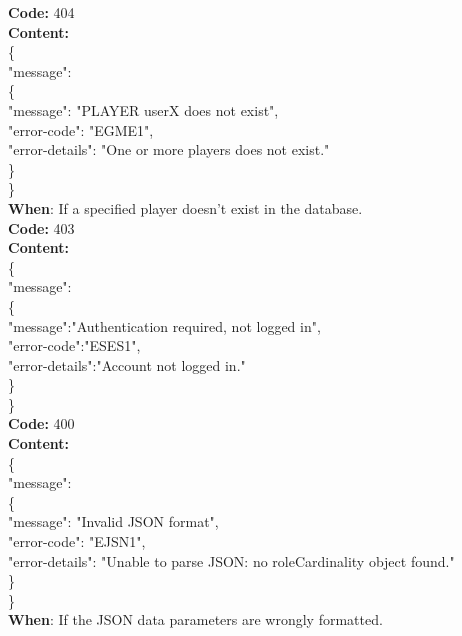 \begin{itemize}
        \textbf{Code:} 404\\
        \textbf{Content:}\\
        \{\\
        \tab "message": \\
        \tab \{\\
        \tab \tab "message": "PLAYER userX does not exist",\\
        \tab \tab "error-code": "EGME1",\\
        \tab \tab "error-details": "One or more players does not exist."\\
         \tab \}\\
        \}\\
        \textbf{When}: If a specified player doesn't exist in the database. \\
        
        \textbf{Code:} 403\\
        \textbf{Content:}\\
        \{\\
         \tab "message":\\
         \tab \{\\
         \tab \tab "message":"Authentication required, not logged in",\\
         \tab \tab "error-code":"ESES1",\\
         \tab \tab "error-details":"Account not logged in."\\
         \tab \}\\
        \}\\
        
        \textbf{Code:} 400\\
        \textbf{Content:}\\
        \{\\
        \tab "message": \\
        \tab \{\\
        \tab \tab "message": "Invalid JSON format",\\
        \tab \tab "error-code": "EJSN1",\\
        \tab \tab "error-details": "Unable to parse JSON: no roleCardinality object found."\\
         \tab \}\\
        \}\\
        \textbf{When}: If the JSON data parameters are wrongly formatted. \\
        

\end{itemize}
